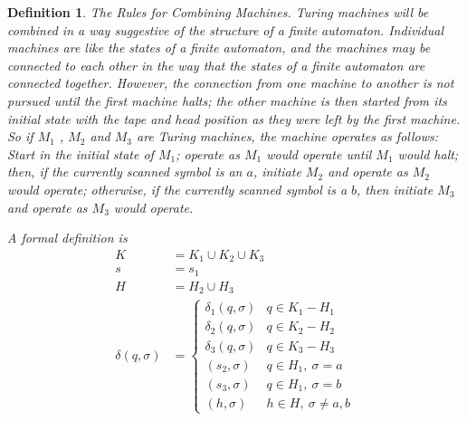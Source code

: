 \documentclass[aps,pra,onecolumn,notitlepage,superscriptaddress]{revtex4-1}
\newtheorem{defi}{Definition}
\begin{document}
    \begin{defi}
        The Rules for Combining Machines. Turing machines will be combined in a way suggestive of the structure of a finite automaton. Individual machines are like the states of a finite automaton, and the machines may be connected to each other in the way that the states of a finite automaton are connected together. However, the connection from one machine to another is not pursued until the first machine halts; the other machine is then started from its initial state with the tape and head position as they were left by the first machine. So if $M_1$ , $M_2$ and $M_3$ are Turing machines, the machine operates as follows: Start in the initial state of $M_1$; operate as $M_1$ would operate until $M_1$ would halt; then, if the currently scanned symbol is an $a$, initiate $M_2$ and operate as $M_2$ would operate; otherwise, if the currently scanned symbol is a $b$, then initiate $M_3$ and operate as $M_3$ would operate.

        A formal definition is
        \begin{align*}
            K &= K_1 \cup K_2 \cup K_3 \\
            s &= s_1 \\
            H &= H_2 \cup H_3 \\
            \delta(q, \sigma) &= \begin{cases}
                \delta_1(q, \sigma) & q \in K_1 - H_1 \\
                \delta_2(q, \sigma) & q \in K_2 - H_2 \\
                \delta_3(q, \sigma) & q \in K_3 - H_3 \\
                (s_2, \sigma) & q \in H_1,\ \sigma=a \\
                (s_3, \sigma) & q \in H_1,\ \sigma=b \\
                (h, \sigma) & h \in H,\ \sigma \neq a,b
            \end{cases}
        \end{align*}
    \end{defi}
\end{document}

